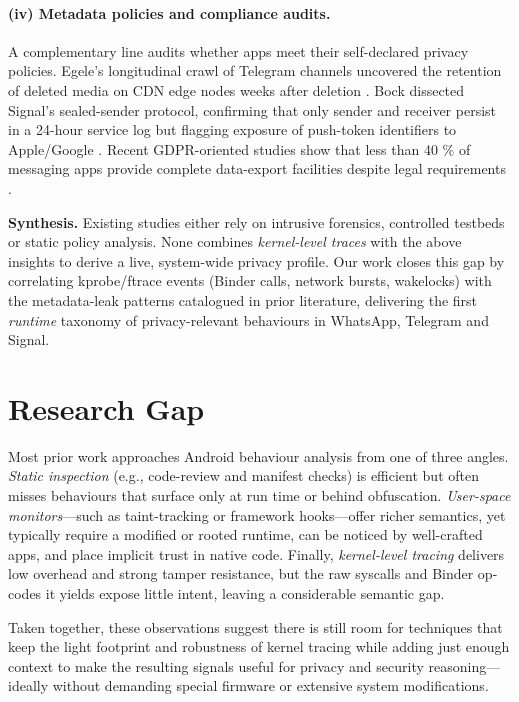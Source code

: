 \documentclass[a4paper,12pt]{report}
\begin{document}
\paragraph{(iv) Metadata policies and compliance audits.}
A complementary line audits whether apps meet their self-declared privacy
policies.  Egele’s longitudinal crawl of Telegram channels uncovered the
retention of deleted media on CDN edge nodes weeks after deletion
\cite{egele2019cdn}.
Bock dissected Signal’s sealed-sender protocol, confirming that only
sender and receiver persist in a 24-hour service log but flagging
exposure of push-token identifiers to Apple/Google \cite{bock2020sealed}.
Recent GDPR-oriented studies show that less than 40 \% of messaging apps
provide complete data-export facilities despite legal requirements
\cite{frolov2022gdpr}.


\medskip
\noindent\textbf{Synthesis.}
Existing studies either rely on intrusive forensics, controlled testbeds
or static policy analysis.  None combines \emph{kernel-level traces} with
the above insights to derive a live, system-wide privacy profile.
Our work closes this gap by correlating kprobe/ftrace events
(Binder calls, network bursts, wakelocks) with the metadata-leak patterns
catalogued in prior literature, delivering the first \emph{runtime}
taxonomy of privacy-relevant behaviours in WhatsApp, Telegram and Signal.

\section{Research Gap}\label{sec:rw:gap}
Most prior work approaches Android behaviour analysis from one of three angles.
\emph{Static inspection} (e.g., code-review and manifest checks) is efficient but often misses behaviours that surface only at run time or behind obfuscation.
\emph{User-space monitors}—such as taint-tracking or framework hooks—offer richer semantics, yet typically require a modified or rooted runtime, can be noticed by well-crafted apps, and place implicit trust in native code.
Finally, \emph{kernel-level tracing} delivers low overhead and strong tamper resistance, but the raw syscalls and Binder op-codes it yields expose little intent, leaving a considerable semantic gap.

Taken together, these observations suggest there is still room for techniques that keep the light footprint and robustness of kernel tracing while adding just enough context to make the resulting signals useful for privacy and security reasoning—ideally without demanding special firmware or extensive system modifications.
\end{document}
